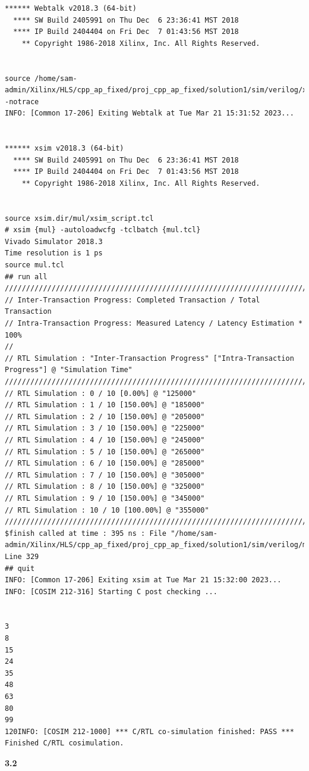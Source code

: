 \documentclass{article}
\begin{document}
\begin{lstlisting}
****** Webtalk v2018.3 (64-bit)
  **** SW Build 2405991 on Thu Dec  6 23:36:41 MST 2018
  **** IP Build 2404404 on Fri Dec  7 01:43:56 MST 2018
    ** Copyright 1986-2018 Xilinx, Inc. All Rights Reserved.


source /home/sam-admin/Xilinx/HLS/cpp_ap_fixed/proj_cpp_ap_fixed/solution1/sim/verilog/xsim.dir/mul/webtalk/xsim_webtalk.tcl -notrace
INFO: [Common 17-206] Exiting Webtalk at Tue Mar 21 15:31:52 2023...


****** xsim v2018.3 (64-bit)
  **** SW Build 2405991 on Thu Dec  6 23:36:41 MST 2018
  **** IP Build 2404404 on Fri Dec  7 01:43:56 MST 2018
    ** Copyright 1986-2018 Xilinx, Inc. All Rights Reserved.


source xsim.dir/mul/xsim_script.tcl
# xsim {mul} -autoloadwcfg -tclbatch {mul.tcl}
Vivado Simulator 2018.3
Time resolution is 1 ps
source mul.tcl
## run all
////////////////////////////////////////////////////////////////////////////////////
// Inter-Transaction Progress: Completed Transaction / Total Transaction
// Intra-Transaction Progress: Measured Latency / Latency Estimation * 100%
//
// RTL Simulation : "Inter-Transaction Progress" ["Intra-Transaction Progress"] @ "Simulation Time"
////////////////////////////////////////////////////////////////////////////////////
// RTL Simulation : 0 / 10 [0.00%] @ "125000"
// RTL Simulation : 1 / 10 [150.00%] @ "185000"
// RTL Simulation : 2 / 10 [150.00%] @ "205000"
// RTL Simulation : 3 / 10 [150.00%] @ "225000"
// RTL Simulation : 4 / 10 [150.00%] @ "245000"
// RTL Simulation : 5 / 10 [150.00%] @ "265000"
// RTL Simulation : 6 / 10 [150.00%] @ "285000"
// RTL Simulation : 7 / 10 [150.00%] @ "305000"
// RTL Simulation : 8 / 10 [150.00%] @ "325000"
// RTL Simulation : 9 / 10 [150.00%] @ "345000"
// RTL Simulation : 10 / 10 [100.00%] @ "355000"
////////////////////////////////////////////////////////////////////////////////////
$finish called at time : 395 ns : File "/home/sam-admin/Xilinx/HLS/cpp_ap_fixed/proj_cpp_ap_fixed/solution1/sim/verilog/mul.autotb.v" Line 329
## quit
INFO: [Common 17-206] Exiting xsim at Tue Mar 21 15:32:00 2023...
INFO: [COSIM 212-316] Starting C post checking ...


3
8
15
24
35
48
63
80
99
120INFO: [COSIM 212-1000] *** C/RTL co-simulation finished: PASS ***
Finished C/RTL cosimulation.

\end{lstlisting}
\vspace{2cm}
\textbf{3.2}
\end{document}
